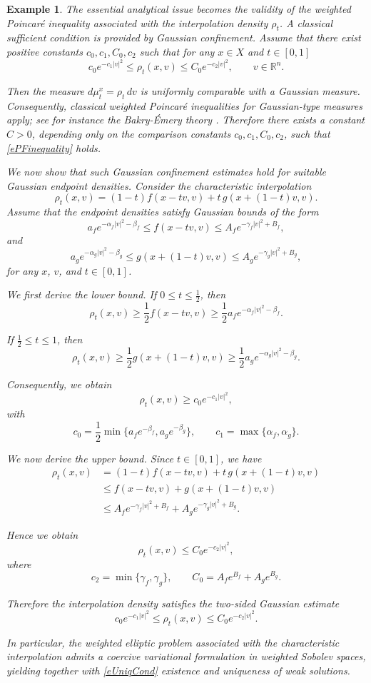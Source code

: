 \documentclass[11pt]{article}
\newtheorem{example}{Example}[section]
\newcommand{\R}{{\mathbb R}}
\begin{document}
\begin{example}
The essential analytical issue becomes the validity of the
weighted Poincar\'e inequality associated with the interpolation density
\(\rho_t\).
A classical sufficient condition is provided by Gaussian confinement.
Assume that there exist positive constants \(c_0,c_1,C_0,c_2\) such that for any $x \in X$ and $t \in [0,1]$
\[
c_0 e^{-c_1|v|^2}
\le
\rho_t(x,v)
\le
C_0 e^{-c_2|v|^2},
\qquad
v\in\R^n.
\]

Then the measure \(d\mu_t^x=\rho_t\,dv\) is uniformly comparable with a
Gaussian measure. Consequently, classical weighted Poincar\'e inequalities
for Gaussian-type measures apply; see for instance the Bakry-\'Emery theory
\cite{BakryEmery1985}. Therefore there exists a constant \(C>0\),
depending only on the comparison constants
\(c_0,c_1,C_0,c_2\), such that \eqref{ePFinequality} holds. 

We now show that such Gaussian confinement estimates hold for suitable
Gaussian endpoint densities. Consider the characteristic interpolation
\[
\rho_t(x,v)
=
(1-t)f(x-tv,v)
+
t\,g(x+(1-t)v,v).
\]
Assume that the endpoint densities satisfy Gaussian bounds of the form
\[
a_f e^{-\alpha_f|v|^2-\beta_f}
\le
f(x-tv,v)
\le
A_f e^{-\gamma_f|v|^2+B_f},
\]
and
\[
a_g e^{-\alpha_g|v|^2-\beta_g}
\le
g(x+(1-t)v,v)
\le
A_g e^{-\gamma_g|v|^2+B_g},
\]
for any \(x\), \(v\), and \(t\in[0,1]\).

We first derive the lower bound. If \(0\le t\le\tfrac12\), then
\[
\rho_t(x,v)
\ge
\frac12 f(x-tv,v)
\ge
\frac12 a_f e^{-\alpha_f|v|^2-\beta_f}.
\]

If \(\tfrac12\le t\le1\), then
\[
\rho_t(x,v)
\ge
\frac12 g(x+(1-t)v,v)
\ge
\frac12 a_g e^{-\alpha_g|v|^2-\beta_g}.
\]

Consequently, we obtain
\[
\rho_t(x,v) \ge c_0 e^{-c_1|v|^2},
\]
with
\[
c_0 = \frac12 \min\{a_f e^{-\beta_f},a_g e^{-\beta_g}\}, \qquad 
c_1 = \max\{\alpha_f,\alpha_g\}.
\]

We now derive the upper bound. Since $t \in [0,1]$, we have
\begin{align*}
\rho_t(x,v)
&=
(1-t)f(x-tv,v)
+
t\,g(x+(1-t)v,v)
\\
&\le
f(x-tv,v)
+
g(x+(1-t)v,v)
\\
&\le
A_f e^{-\gamma_f|v|^2+B_f}
+
A_g e^{-\gamma_g|v|^2+B_g}.
\end{align*}

Hence we obtain
\[
\rho_t(x,v)
\le
C_0 e^{-c_2|v|^2},
\]
where
\[
c_2
=
\min\{\gamma_f,\gamma_g\}, \qquad
C_0 = A_f e^{B_f}+A_g e^{B_g}.
\]


Therefore the interpolation density satisfies the two-sided Gaussian estimate
\[
c_0 e^{-c_1|v|^2} \le \rho_t(x,v) \le C_0 e^{-c_2|v|^2}.
\]

In particular, the weighted elliptic problem associated with the
characteristic interpolation admits a coercive variational formulation in
weighted Sobolev spaces, yielding together with \eqref{eUniqCond} existence 
and uniqueness of weak solutions.
\end{example}
\end{document}
